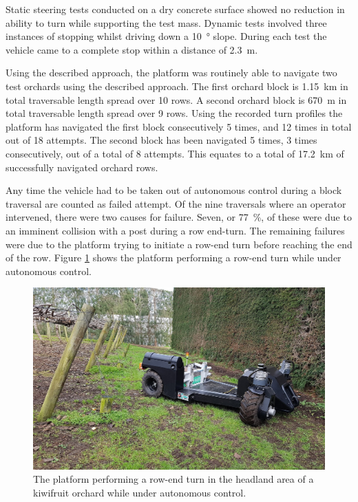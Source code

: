 \documentclass[preprint,authoryear,12pt]{elsarticle}
\begin{document}
    Static steering tests conducted on a dry concrete surface showed no reduction in ability to turn while supporting the test mass.
    Dynamic tests involved three instances of stopping whilst driving down a \SI{10}{\degree} slope.
    During each test the vehicle came to a complete stop within a distance of \SI{2.3}{\meter}.

    Using the described approach, the platform was routinely able to navigate two test orchards using the described approach.
    The first orchard block is \SI{1.15}{\kilo\meter} in total traversable length spread over 10 rows.
    A second orchard block is \SI{670}{\meter} in total traversable length spread over 9 rows.
    Using the recorded turn profiles the platform has navigated the first block consecutively 5 times, and 12 times in total out of 18 attempts.
    The second block has been navigated 5 times, 3 times consecutively, out of a total of 8 attempts.
    This equates to a total of \SI{17.2}{\kilo\meter} of successfully navigated orchard rows.

    Any time the vehicle had to be taken out of autonomous control during a block traversal are counted as failed attempt.
    Of the nine traversals where an operator intervened, there were two causes for failure.
    Seven, or \SI{77}{\percent}, of these were due to an imminent collision with a post during a row end-turn.
    The remaining failures were due to the platform trying to initiate a row-end turn before reaching the end of the row.
    Figure \ref{fig:suzy_turning} shows the platform performing a row-end turn while under autonomous control.

    \begin{figure}[htb]
        \centering
        \includegraphics[width=\linewidth]{imgs/photos/suzy_turning.jpg}
        \caption{
            The platform performing a row-end turn in the headland area of a kiwifruit orchard while under autonomous control.
        }
        \label{fig:suzy_turning}
    \end{figure}
\end{document}
